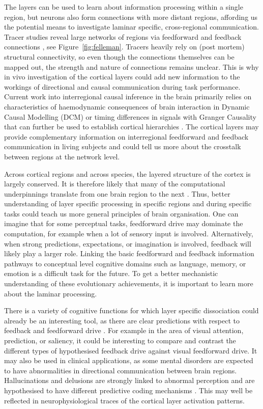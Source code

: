 The layers can be used to learn about information processing within a single region, but neurons also form connections with more distant regions, affording us the potential means to investigate laminar specific,  cross-regional communication. Tracer studies reveal large networks of regions via feedforward and feedback connections \cite{Felleman1991}, see Figure~\ref{fig:felleman}. Tracers heavily rely on (post mortem) structural connectivity, so even though the connections themselves can be mapped out, the strength and nature of connections remains unclear. This is why in vivo investigation of the cortical layers could add new information to the workings of directional and causal communication during task performance. Current work into interregional causal inference in the brain primarily relies on characteristics of haemodynamic consequences of brain interaction in Dynamic Causal Modelling (DCM) \cite{Friston2009} or timing differences in signals with Granger Causality \cite{Aalen2007} that can further be used to establish cortical hierarchies \cite{Michalareas2016}. The cortical layers may provide complementary information on interregional feedforward and feedback communication in living subjects and could tell us more about the crosstalk between regions at the network level.


Across cortical regions and across species, the layered structure of the cortex is largely conserved. It is therefore likely that many of the computational underpinnings translate from one brain region to the next \cite{Buonomano1998}. Thus, better understanding of layer specific processing in specific regions and during specific tasks could teach us more general principles of brain organisation. One can imagine that for some perceptual tasks, feedforward drive may dominate the computation, for example when a lot of sensory input is involved. Alternatively, when strong predictions, expectations, or imagination is involved, feedback will likely play a larger role. Linking the basic feedforward and feedback information pathways to conceptual level cognitive domains such as language, memory, or emotion is a difficult task for the future. To get a better mechanistic understanding of these evolutionary achievements, it is important to learn more about the laminar processing.

There is a variety of cognitive functions for which layer specific dissociation could already be an interesting tool, as there are clear predictions with respect to feedback and feedforward drive \cite{Lawrence2017}. For example in the area of visual attention, prediction, or saliency, it could be interesting to compare and contrast the different types of hypothesised feedback drive against visual feedforward drive. It may also be used in clinical applications, as some mental disorders are expected to have abnormalities in directional communication between brain regions. Hallucinations and delusions are strongly linked to abnormal perception and are hypothesised to have different predictive coding mechanisms \cite{Fletcher2008}. This may well be reflected in neurophysiological traces of the cortical layer activation patterns. 

